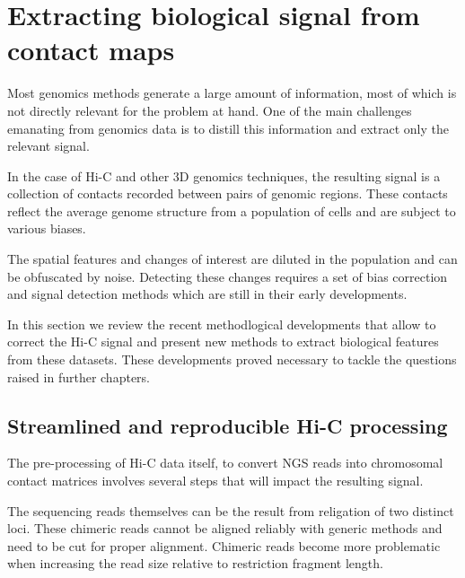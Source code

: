 
\chapter{Extracting biological signal from contact maps} %

\label{ch:02-01} %


Most genomics methods generate a large amount of information, most of which is not directly relevant for the problem at hand. One of the main challenges emanating from genomics data is to distill this information and extract only the relevant signal.

In the case of Hi-C and other 3D genomics techniques, the resulting signal is a collection of contacts recorded between pairs of genomic regions. These contacts reflect the average genome structure from a population of cells and are subject to various biases.

The spatial features and changes of interest are diluted in the population and can be obfuscated by noise. Detecting these changes requires a set of bias correction and signal detection methods which are still in their early developments.

In this section we review the recent methodlogical developments that allow to correct the Hi-C signal and present new methods to extract biological features from these datasets. These developments proved necessary to tackle the questions raised in further chapters.

\section{Streamlined and reproducible Hi-C processing}
\label{sec:02-01:streamlined-processing}

The pre-processing of Hi-C data itself, to convert \acrfull{NGS} reads into chromosomal contact matrices involves several steps that will impact the resulting signal.

The sequencing reads themselves can be the result from religation of two distinct loci. These chimeric reads cannot be aligned reliably with generic methods and need to be cut for proper alignment. Chimeric reads become more problematic when increasing the read size relative to restriction fragment length.

